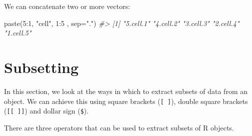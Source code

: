 \documentclass[
]{book}
\newenvironment{Shaded}{\begin{snugshade}}{\end{snugshade}}
\newcommand{\AttributeTok}[1]{\textcolor[rgb]{0.77,0.63,0.00}{#1}}
\newcommand{\CommentTok}[1]{\textcolor[rgb]{0.56,0.35,0.01}{\textit{#1}}}
\newcommand{\DecValTok}[1]{\textcolor[rgb]{0.00,0.00,0.81}{#1}}
\newcommand{\FunctionTok}[1]{\textcolor[rgb]{0.00,0.00,0.00}{#1}}
\newcommand{\NormalTok}[1]{#1}
\newcommand{\SpecialCharTok}[1]{\textcolor[rgb]{0.00,0.00,0.00}{#1}}
\newcommand{\StringTok}[1]{\textcolor[rgb]{0.31,0.60,0.02}{#1}}
\begin{document}
We can concatenate two or more vectors:

\begin{Shaded}
\begin{Highlighting}[]
\FunctionTok{paste}\NormalTok{(}\DecValTok{5}\SpecialCharTok{:}\DecValTok{1}\NormalTok{, }\StringTok{"cell"}\NormalTok{, }\DecValTok{1}\SpecialCharTok{:}\DecValTok{5}\NormalTok{ , }\AttributeTok{sep=}\StringTok{"."}\NormalTok{)}
\CommentTok{\#\textgreater{} [1] "5.cell.1" "4.cell.2" "3.cell.3" "2.cell.4" "1.cell.5"}
\end{Highlighting}
\end{Shaded}

\hypertarget{subsetting}{%
\section{Subsetting}\label{subsetting}}

In this section, we look at the ways in which to extract subsets of data from an object. We can achieve this using square brackets (\texttt{{[}\ {]}}), double square brackets (\texttt{{[}{[}\ {]}{]}}) and dollar sign (\texttt{\$}).

There are three operators that can be used to extract subsets of R objects.
\end{document}
